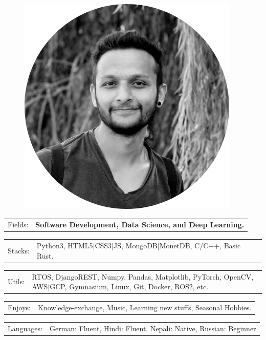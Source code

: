 \documentclass[10pt,A4]{article}
\newcommand{\tzlarrow}{(0,0) -- (0.2,0) -- (0.3,0.2) -- (0.2,0.4) -- (0,0.4) -- (0.1,0.2) -- cycle;}
\newcommand{\larrow}[1]
{\begin{tikzpicture}[scale=0.58]
	 \filldraw[fill=#1!100,draw=#1!100!black]  \tzlarrow
 \end{tikzpicture}
}
\newcommand{\metasection}[2]
{
\begin{tabular*}{1\textwidth}{p{2.4cm} p{11cm}}
\larrow{bgcol}	\normalsize{\textcolor{sectcol}{#1}}&#2\\[12pt]
\end{tabular*}
}
\begin{document}
\pagestyle{fancy}


\vspace{-20.55pt}


\hspace{-0.25\linewidth}\colorbox{bgcol}{}



\begin{figure}[H]
\begin{flushright}
	\includegraphics[width=0.20\linewidth]{profile.png}	%
\end{flushright}
\end{figure}



\vspace{-130pt}

\metasection{Fields:}{\textbf{Software Development, Data Science, and Deep Learning.}}
\metasection{Stacks:}{Python3, HTML5|CSS3|JS, MongoDB|MonetDB, C/C++, Basic Rust.}
\vspace{5pt}
\metasection{Utils:}{RTOS, DjangoREST, Numpy, Pandas, Matplotlib, PyTorch, OpenCV, AWS|GCP,
	Gymnasium, Linux, Git, Docker, ROS2, etc. }
\metasection{Enjoys:}{Knowledge-exchange, Music, Learning new stuffs, Seasonal Hobbies. }
\metasection{Languages:}{German: Fluent, Hindi: Fluent, Nepali: Native, Russian: Beginner}
\end{document}
